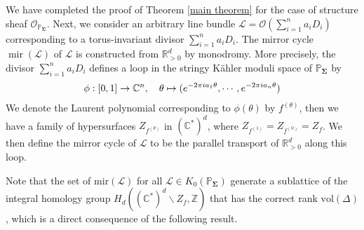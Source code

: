 \documentclass[11pt,reqno]{amsart}
\def\C {{\mathbb C}}
\def\CC {{\mathbb C}}
\def\R {{\mathbb R}}
\def\Z {{\mathbb Z}}
\def\PP {{\mathbb P}}
\theoremstyle{definition}
\numberwithin{equation}{section}
\begin{document}
We have completed the proof of Theorem \ref{main theorem} for the case of structure sheaf $\mathcal{O}_{\PP_{\mathbf{\Sigma}}}$. Next, we consider an arbitrary line bundle $\mathcal{L}=\mathcal{O}(\sum_{i=1}^n a_i D_i)$ corresponding to a torus-invariant divisor $\sum_{i=1}^n a_iD_i$. The mirror cycle $\operatorname{mir}(\mathcal{L})$ of $\mathcal{L}$ is constructed from $\R_{>0}^d$ by monodromy. More precisely, the divisor $\sum_{i=1}^n a_iD_i$ defines a loop in the stringy K\"ahler moduli space of $\PP_{\mathbf{\Sigma}}$ by
\begin{align}\label{loop}
	\phi:[0,1]\rightarrow \CC^n,\quad \theta\mapsto (e^{-2\pi{\rm i}a_1\theta},\cdots,e^{-2\pi{\rm i}a_n\theta})
\end{align}
We denote the Laurent polynomial corresponding to $\phi(\theta)$ by $f^{(\theta)}$, then we have a family of hypersurfaces $Z_{f^{(\theta)}}$ in $(\C^*)^d$, where $Z_{f^{(1)}}=Z_{f^{(0)}}=Z_{f}$. We then define the mirror cycle of $\mathcal{L}$ to be the parallel transport of $\R_{>0}^d$ along this loop.

\smallskip

Note that the set of $\mathrm{mir}(\mathcal{L})$ for all $\mathcal{L}\in K_0(\PP_{\mathbf{\Sigma}})$ generate a sublattice of the integral homology group $H_{d}\left((\CC^*)^{d}\backslash Z_f,\Z\right)$ that has the correct rank $\mathrm{vol}(\Delta)$, which is a direct consequence of the following result.

\smallskip
\end{document}
